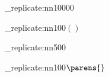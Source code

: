 \documentclass{minimal}
\begin{document}
\null

\ExplSyntaxNamesOn

\profile{\begin{document}}
\prg_replicate:nn{10000}{%
  \prg_replicate:nn{100}{$\left(\right)$\space}%
  \par
}
\prg_replicate:nn{500}{%
  \prg_replicate:nn{100}{$\parens{}$\space}%
  \par
}
\profile{50000 \parens{}}

\ExplSyntaxNamesOff

\end{document}
